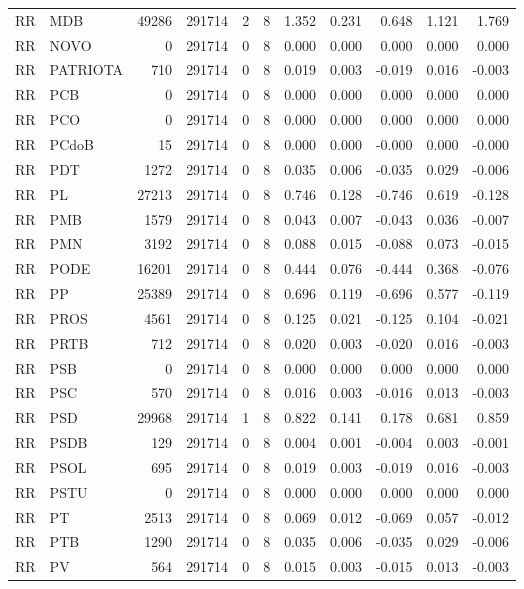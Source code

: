\begin{landscape}
\begin{longtable}{llrrrrrrrrr}
RR & MDB & 49286 & 291714 & 2 & 8 & 1.352 & 0.231 & 0.648 & 1.121 & 1.769 \\
RR & NOVO & 0 & 291714 & 0 & 8 & 0.000 & 0.000 & 0.000 & 0.000 & 0.000 \\
RR & PATRIOTA & 710 & 291714 & 0 & 8 & 0.019 & 0.003 & -0.019 & 0.016 & -0.003 \\
RR & PCB & 0 & 291714 & 0 & 8 & 0.000 & 0.000 & 0.000 & 0.000 & 0.000 \\
RR & PCO & 0 & 291714 & 0 & 8 & 0.000 & 0.000 & 0.000 & 0.000 & 0.000 \\
RR & PCdoB & 15 & 291714 & 0 & 8 & 0.000 & 0.000 & -0.000 & 0.000 & -0.000 \\
RR & PDT & 1272 & 291714 & 0 & 8 & 0.035 & 0.006 & -0.035 & 0.029 & -0.006 \\
RR & PL & 27213 & 291714 & 0 & 8 & 0.746 & 0.128 & -0.746 & 0.619 & -0.128 \\
RR & PMB & 1579 & 291714 & 0 & 8 & 0.043 & 0.007 & -0.043 & 0.036 & -0.007 \\
RR & PMN & 3192 & 291714 & 0 & 8 & 0.088 & 0.015 & -0.088 & 0.073 & -0.015 \\
RR & PODE & 16201 & 291714 & 0 & 8 & 0.444 & 0.076 & -0.444 & 0.368 & -0.076 \\
RR & PP & 25389 & 291714 & 0 & 8 & 0.696 & 0.119 & -0.696 & 0.577 & -0.119 \\
RR & PROS & 4561 & 291714 & 0 & 8 & 0.125 & 0.021 & -0.125 & 0.104 & -0.021 \\
RR & PRTB & 712 & 291714 & 0 & 8 & 0.020 & 0.003 & -0.020 & 0.016 & -0.003 \\
RR & PSB & 0 & 291714 & 0 & 8 & 0.000 & 0.000 & 0.000 & 0.000 & 0.000 \\
RR & PSC & 570 & 291714 & 0 & 8 & 0.016 & 0.003 & -0.016 & 0.013 & -0.003 \\
RR & PSD & 29968 & 291714 & 1 & 8 & 0.822 & 0.141 & 0.178 & 0.681 & 0.859 \\
RR & PSDB & 129 & 291714 & 0 & 8 & 0.004 & 0.001 & -0.004 & 0.003 & -0.001 \\
RR & PSOL & 695 & 291714 & 0 & 8 & 0.019 & 0.003 & -0.019 & 0.016 & -0.003 \\
RR & PSTU & 0 & 291714 & 0 & 8 & 0.000 & 0.000 & 0.000 & 0.000 & 0.000 \\
RR & PT & 2513 & 291714 & 0 & 8 & 0.069 & 0.012 & -0.069 & 0.057 & -0.012 \\
RR & PTB & 1290 & 291714 & 0 & 8 & 0.035 & 0.006 & -0.035 & 0.029 & -0.006 \\
RR & PV & 564 & 291714 & 0 & 8 & 0.015 & 0.003 & -0.015 & 0.013 & -0.003 \\

\end{longtable}
\end{landscape}
